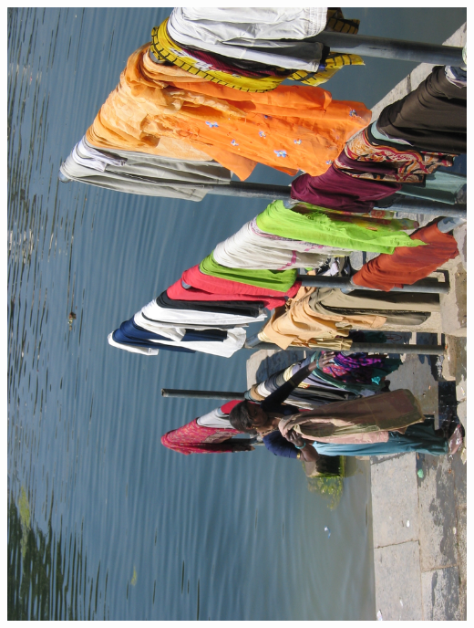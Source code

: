 %
\newpage\vspace*{-5cm}
\thispagestyle{empty}
\hspace*{-4cm}
\includegraphics[width=15.9cm]{articles/pagesCentrales/inde315.jpg}

